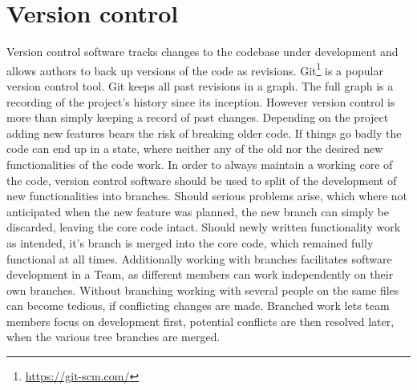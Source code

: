 \section{Version control}
Version control software tracks changes to the codebase under development and allows authors to back up versions of the code as revisions. Git\footnote{\url{https://git-scm.com/}} is a popular version control tool. Git keeps all past revisions in a graph. The full graph is a recording of the project's history since its inception. However version control is more than simply keeping a record of past changes. Depending on the project adding new features bears the risk of breaking older code. If things go badly the code can end up in a state, where neither any of the old nor the desired new functionalities of the code work. In order to always maintain a working core of the code, version control software should be used to split of the development of new functionalities into branches. Should serious problems arise, which where not anticipated when the new feature was planned, the new branch can simply be discarded, leaving the core code intact. Should newly written functionality work as intended, it's branch is merged into the core code, which remained fully functional at all times.
Additionally working with branches facilitates software development in a Team, as different members can work independently on their own branches. Without branching working with several people on the same files can become tedious, if conflicting changes are made. Branched work lets team members focus on development first, potential conflicts are then resolved later, when the various tree branches are merged.